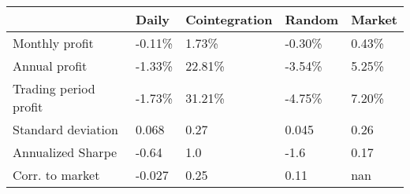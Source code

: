 \begin{tabular}{lllll}
\toprule
{} &    Daily & Cointegration &   Random &  Market \\
\midrule
Monthly profit        &  -0.11\% &        1.73\% &  -0.30\% &  0.43\% \\
Annual profit         &  -1.33\% &       22.81\% &  -3.54\% &  5.25\% \\
Trading period profit &  -1.73\% &       31.21\% &  -4.75\% &  7.20\% \\
Standard deviation    &    0.068 &          0.27 &    0.045 &    0.26 \\
Annualized Sharpe     &    -0.64 &           1.0 &     -1.6 &    0.17 \\
Corr. to market       &   -0.027 &          0.25 &     0.11 &     nan \\
\bottomrule
\end{tabular}

